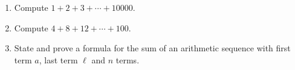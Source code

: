 \begin{enumerate}
\item[(a)] Compute $1+2+3+\cdots+10000$.
\item[(b)] Compute $4+8+12+\cdots+100$.
\item[(c)] State and prove a formula for the sum of an arithmetic sequence with first term $a$, last term $\ell$ and $n$ terms.
\end{enumerate}
